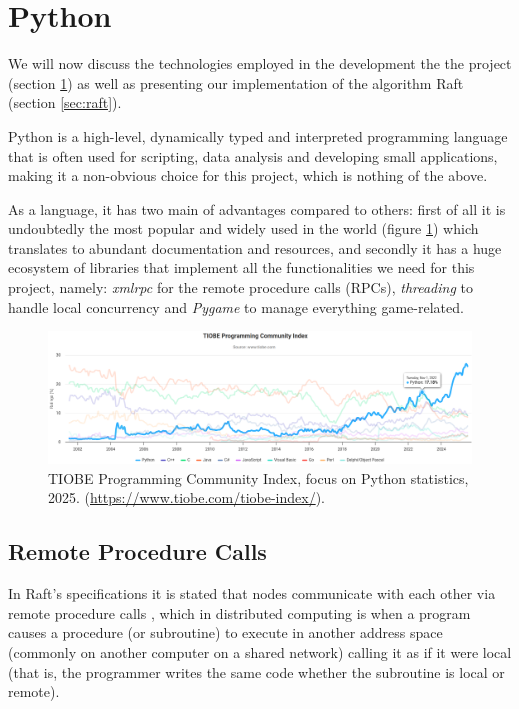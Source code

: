 \section{Python} \label{sec:python}

We will now discuss the technologies employed in the development the the project (section \ref{sec:python}) as well as presenting our implementation of the algorithm Raft (section \ref{sec:raft}).

Python is a high-level, dynamically typed and interpreted programming language that is often used for scripting, data analysis and developing small applications, making it a non-obvious choice for this project, which is nothing of the above. 

As a language, it has two main of advantages compared to others: first of all it is undoubtedly the most popular and widely used in the world (figure \ref{fig:tiobe}) \cite{tiobe,ieeeSpect} which translates to abundant documentation and resources, and secondly it has a huge ecosystem of libraries that implement all the functionalities we need for this project, namely: \textit{xmlrpc} for the remote procedure calls (RPCs), \textit{threading} to handle local concurrency and \textit{Pygame} to manage everything game-related.

\begin{figure}[h]
  \centering
  \includegraphics[width=\linewidth]{images/TIOBEindex.png}
  \caption{TIOBE Programming Community Index, focus on Python statistics, 2025. (\url{https://www.tiobe.com/tiobe-index/}).}
  \label{fig:tiobe}
\end{figure}


\subsection{Remote Procedure Calls} \label{sec:xmlrpc}

In Raft's specifications it is stated that nodes communicate with each other via remote procedure calls \cite{raft}, which in distributed computing is when a program causes a procedure (or subroutine) to execute in another address space (commonly on another computer on a shared network) calling it as if it were local (that is, the programmer writes the same code whether the subroutine is local or remote).

